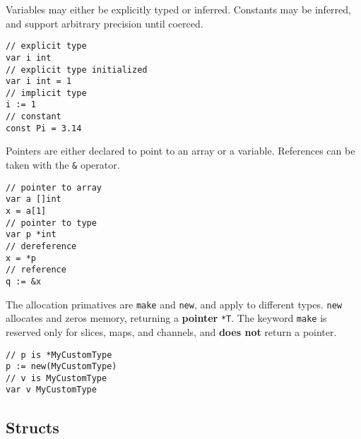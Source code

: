 \documentclass{article}
\begin{document}
\begin{paracol}{2}
\noindent Variables may either be explicitly typed or inferred. Constants may be inferred, and support arbitrary precision until coerced.

\switchcolumn

\begin{lstlisting}
// explicit type
var i int
// explicit type initialized
var i int = 1
// implicit type
i := 1
// constant
const Pi = 3.14
\end{lstlisting}


\switchcolumn*

\noindent Pointers are either declared to point to an array or a variable. References can be taken with the \lstinline{&} operator.

\switchcolumn

\begin{lstlisting}
// pointer to array
var a []int
x = a[1]
// pointer to type
var p *int 
// dereference
x = *p
// reference
q := &x
\end{lstlisting}

\switchcolumn*

\noindent The allocation primatives are \lstinline|make| and \lstinline|new|, and apply to different types. \lstinline|new| allocates and zeros memory, returning a \textbf{pointer} \lstinline|*T|. The keyword \lstinline|make| is reserved only for slices, maps, and channels, and \textbf{does not} return a pointer.
\\

\switchcolumn

\begin{lstlisting}
// p is *MyCustomType
p := new(MyCustomType)
// v is MyCustomType
var v MyCustomType
\end{lstlisting}

\end{paracol}


\subsection{Structs}
\end{document}
